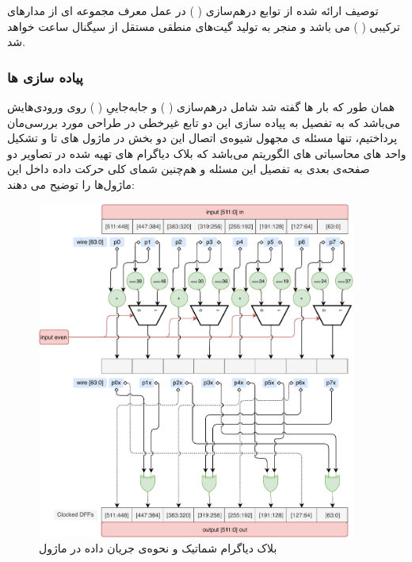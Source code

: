 توصیف ارائه شده از توابع درهم‌سازی (
) 
در عمل معرف مجموعه ای از مدار‌های ترکیبی (
) می باشد و منجر به تولید گیت‌های منطقی مستقل از سیگنال ساعت خواهد شد.

\subsubsection{
	پیاده سازی 
	ها
}
همان طور که بار ها گفته شد  شامل درهم‌سازی 
(
)
و
جابه‌جاییِ 
(
)
روی ورودی‌هایش می‌باشد که به تفصیل به پیاده سازی این دو تابع غیرخطی در طراحی مورد بررسی‌مان پرداختیم، تنها مسئله ی مجهول شیوه‌ی اتصال این دو بخش در ماژول های 
تا 
و تشکیل واحد های محاسباتی  های الگوریتم می‌باشد که بلاک دیاگرام های تهیه شده در تصاویر دو صفحه‌ی بعدی به تفصیل این مسئله و هم‌چنین شمای کلی حرکت داده داخل این ماژول‌ها را توضیح می دهند:
\begin{figure}[H]
	\centering
	\includegraphics[width=10.5cm]{Images/VerilogDocumentation/diagrams_round1.pdf}	
	\caption{
	بلاک دیاگرام شماتیک و نحوه‌ی جریان داده در ماژول 
}
\end{figure}
